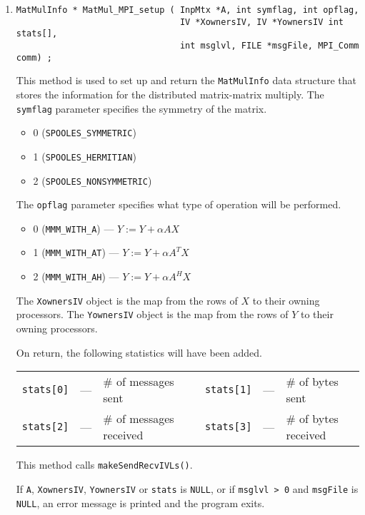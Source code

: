 \begin{enumerate}
\item
\begin{verbatim}
MatMulInfo * MatMul_MPI_setup ( InpMtx *A, int symflag, int opflag,
                                IV *XownersIV, IV *YownersIV int stats[], 
                                int msglvl, FILE *msgFile, MPI_Comm comm) ;
\end{verbatim}
This method is used to set up and return the {\tt MatMulInfo} 
data structure that stores the information for the distributed
matrix-matrix multiply.
The {\tt symflag} parameter specifies the symmetry of the matrix.
\begin{itemize}
\item
0 ({\tt SPOOLES\_SYMMETRIC}) 
\item
1 ({\tt SPOOLES\_HERMITIAN}) 
\item
2 ({\tt SPOOLES\_NONSYMMETRIC}) 
\end{itemize}
The {\tt opflag} parameter specifies what type of operation will
be performed.
\begin{itemize}
\item
0 ({\tt MMM\_WITH\_A}) --- $Y := Y + \alpha A X$
\item
1 ({\tt MMM\_WITH\_AT}) --- $Y := Y + \alpha A^T X$
\item
2 ({\tt MMM\_WITH\_AH}) --- $Y := Y + \alpha A^H X$
\end{itemize}
The {\tt XownersIV} object is the map from the rows of $X$ to their
owning processors.
The {\tt YownersIV} object is the map from the rows of $Y$ to their
owning processors.
\par
On return, the following statistics will have been added.
\begin{center}
\begin{tabular}{cclcccl}
{\tt stats[0]} & --- & \# of messages sent 
& &
{\tt stats[1]} & --- & \# of bytes sent \\
{\tt stats[2]} & --- & \# of messages received 
& &
{\tt stats[3]} & --- & \# of bytes received 
\end{tabular}
\end{center}
This method calls {\tt makeSendRecvIVLs()}.
\par {}
If {\tt A}, {\tt XownersIV}, {\tt YownersIV} 
or {\tt stats} is {\tt NULL}, 
or if {\tt msglvl > 0} and {\tt msgFile} is {\tt NULL},
an error message is printed and the program exits.

\end{enumerate}
